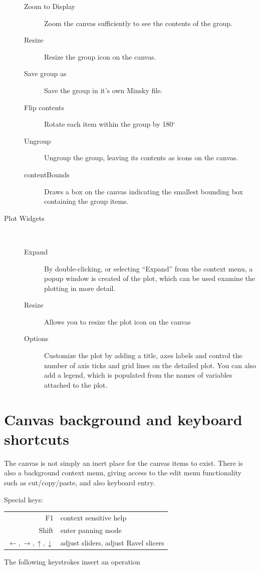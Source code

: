 \begin{description}
\begin{description}
\item [{Zoom to Display}] Zoom the canvas sufficiently to see the contents
of the group. 
\item [{Resize}] Resize the group icon on the canvas. 
\item [{Save group as}] Save the group in it's own Minsky file. 
\item [{Flip contents}] Rotate each item within the group by 180$^{\circ}$ 
\item [{Ungroup}] Ungroup the group, leaving its contents as icons on the
canvas. 
\item [{contentBounds}] Draws a box on the canvas indicating the smallest
bounding box containing the group items. 
\end{description}
\item [{Plot Widgets}] %
\mbox{%
%
} 
\begin{description}
\item [{Expand}] By double-clicking, or selecting ``Expand'' from the
context menu, a popup window is created of the plot, which can be
used examine the plotting in more detail.
\item [{Resize}] Allows you to resize the plot icon on the canvas 
\item [{Options}] Customize the plot by adding a title, axes labels and
control the number of axis ticks and grid lines on the detailed plot.
You can also add a legend, which is populated from the names of variables
attached to the plot. 
\end{description}
\end{description}

\section{Canvas background and keyboard shortcuts}

The canvas is not simply an inert place for the canvas items to exist.
There is also a background context menu, giving access to the edit
menu functionality such as cut/copy/paste, and also keyboard entry.

Special keys: %
\begin{tabular}{rl}
F1  & context sensitive help\tabularnewline
Shift  & enter panning mode\tabularnewline
$\leftarrow,\rightarrow,\uparrow,\downarrow$  & adjust sliders, adjust Ravel slicers\tabularnewline
\end{tabular}

The following keystrokes insert an operation


